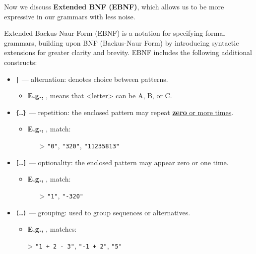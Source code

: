 \noindent
Now we discuss \textbf{Extended BNF (EBNF)}, which allows us to be more expressive in our grammars with less noise.

\begin{Def}

\label{def:ebnf}
Extended Backus-Naur Form (EBNF) is a notation for specifying formal grammars, building upon BNF (Backus-Naur Form) by introducing syntactic extensions for greater clarity and brevity.
EBNF includes the following additional constructs:

\begin{itemize}
    
    \item \texttt{|} — alternation: denotes choice between patterns.
    \begin{itemize}
        \item \textbf{E.g.,}  , means that <letter> can be A, B, or C.
    \end{itemize}
    \item \texttt{\{\ldots \}} — repetition: the enclosed pattern may repeat \underline{\textbf{zero} or more times}.
    \begin{itemize}
        \item \textbf{E.g.,}  , match:
        \begin{itemize}
            \item[>] \texttt{"0"}, \texttt{"320"}, \texttt{"11235813"}
        \end{itemize}
    \end{itemize}
    \item \texttt{[\ldots ]} — optionality: the enclosed pattern may appear zero or one time.
    \begin{itemize}
        \item \textbf{E.g.,} , match:
        \begin{itemize}
            \item[>] \texttt{"1"}, \texttt{"-320"}
        \end{itemize}
    \end{itemize}
    \item \texttt{(\ldots )} — grouping: used to group sequences or alternatives.
    \begin{itemize}
        \item \textbf{E.g.,} , matches:
        \item [>] \texttt{"1 + 2 - 3"}, \texttt{"-1 + 2"}, \texttt{"5"}

\end{itemize}
\end{itemize}
\end{Def}
